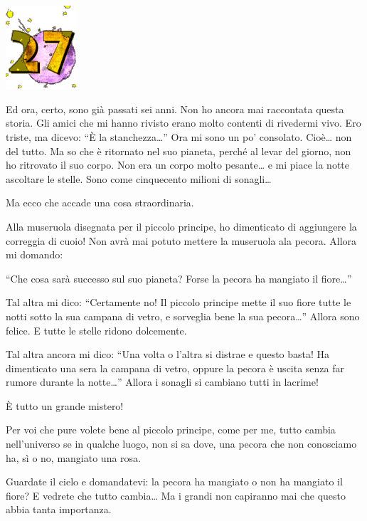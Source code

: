 \documentclass[11pt]{scrbook}
\begin{document}
\chapter{}
\begin{center}
\includegraphics{img/chapter27}
\end{center}

Ed ora, certo, sono già passati sei anni. Non ho ancora mai raccontata questa storia. Gli amici che mi hanno rivisto erano molto contenti di rivedermi vivo. Ero triste, ma dicevo: ``È la stanchezza\ldots{}'' Ora mi sono un po' consolato. Cioè\ldots{} non del tutto. Ma so che è ritornato nel suo pianeta, perché al levar del giorno, non ho ritrovato il suo corpo. Non era un corpo molto pesante\ldots{} e mi piace la notte ascoltare le stelle. Sono come cinquecento milioni di sonagli\ldots{}

Ma ecco che accade una cosa straordinaria.

Alla museruola disegnata per il piccolo principe, ho dimenticato di aggiungere la correggia di cuoio! Non avrà mai potuto mettere la museruola ala pecora. Allora mi domando:

``Che cosa sarà successo sul suo pianeta? Forse la pecora ha mangiato il fiore\ldots{}''

Tal altra mi dico: ``Certamente no! Il piccolo principe mette il suo fiore tutte le notti sotto la sua campana di vetro, e sorveglia bene la sua pecora\ldots{}'' Allora sono felice. E tutte le stelle ridono dolcemente.

Tal altra ancora mi dico: ``Una volta o l'altra si distrae e questo basta! Ha dimenticato una sera la campana di vetro, oppure la pecora è uscita senza far rumore durante la notte\ldots{}'' Allora i sonagli si cambiano tutti in lacrime!

È tutto un grande mistero!

Per voi che pure volete bene al piccolo principe, come per me, tutto cambia nell'universo se in qualche luogo, non si sa dove, una pecora che non conosciamo ha, sì o no, mangiato una rosa.

Guardate il cielo e domandatevi: la pecora ha mangiato o non ha mangiato il fiore? E vedrete che tutto cambia\ldots{} Ma i grandi non capiranno mai che questo abbia tanta importanza.
\end{document}
